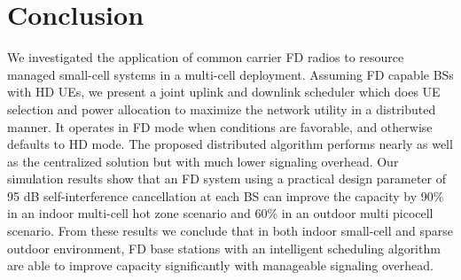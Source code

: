 \documentclass[journal]{IEEEtran}
\begin{document}
\section{Conclusion}\label{sec:conc}
We investigated the application of common carrier FD radios to resource managed small-cell systems in a multi-cell deployment. Assuming FD capable BSs with HD UEs, we present a joint uplink and downlink scheduler which does UE selection and power allocation to maximize the network utility in a distributed manner. It operates in FD mode when conditions are favorable, and otherwise defaults to HD mode. The proposed distributed algorithm performs nearly as well as the centralized solution but with much lower signaling overhead. Our simulation results show that an FD system using a practical design parameter of 95 dB self-interference cancellation at each BS can improve the capacity by 90\% in an indoor multi-cell hot zone scenario and 60\% in an outdoor multi picocell scenario. From these results we conclude that in both indoor small-cell and sparse outdoor environment, FD base stations with an intelligent scheduling algorithm are able to improve capacity significantly with manageable signaling overhead.



\end{document}
